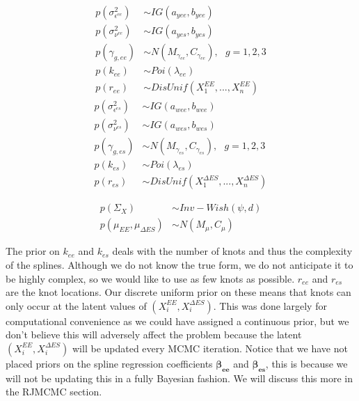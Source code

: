 \documentclass[11pt]{article}\usepackage[]{graphicx}\usepackage[]{color}
\begin{document}
\begin{multicols}{2}
\noindent 
  \begin{align}
  p(\sigma^2_{\epsilon^{ee}}) &\sim IG(a_{yee},b_{yee}) \\
  p(\sigma^2_{\nu^{ee}}) &\sim IG(a_{yes},b_{yes}) \\
  p(\gamma_{g,ee}) &\sim N(M_{\gamma_{ee}},C_{\gamma_{ee}})  , \text{ } g=1,2,3 \\
  p(k_{ee}) &\sim Poi(\lambda_{ee}) \\
  p(r_{ee}) &\sim DisUnif(X_1^{EE},...,X_n^{EE})
  \end{align}
\columnbreak
  \begin{align}
  p(\sigma^2_{\epsilon^{es}}) &\sim IG(a_{wee},b_{wee}) \\
  p(\sigma^2_{\nu^{es}}) &\sim IG(a_{wes},b_{wes}) \\
  p(\gamma_{g,es}) &\sim N(M_{\gamma_{es}},C_{\gamma_{es}}) , \text{ } g=1,2,3 \\
  p(k_{es}) &\sim Poi(\lambda_{es}) \\
  p(r_{es}) &\sim DisUnif(X_1^{\Delta ES},...,X_n^{\Delta ES})
  \end{align}
\end{multicols}



\begin{align}
   p(\Sigma_{X}) &\sim Inv-Wish(\psi,d) \\
   p(\mu_{EE},\mu_{\Delta ES}) &\sim N(M_{\mu},C_{\mu})
\end{align}



The prior on $k_{ee}$ and $k_{es}$ deals with the number of knots and thus the complexity of the splines. Although we do not know the true form, we do not anticipate it to be highly complex, so we would like to use as few knots as possible. $r_{ee}$ and $r_{es}$ are the knot locations. Our discrete uniform prior on these means that knots can only occur at the latent values of $(X_i^{EE},X_i^{\Delta ES})$. This was done largely for computational convenience as we could have assigned a continuous prior, but we don't believe this will adversely affect the problem because the latent $(X_i^{EE},X_i^{\Delta ES})$ will be updated every MCMC iteration. Notice that we have not placed priors on the spline regression coefficients $\boldsymbol{\beta_{ee}}$ and $\boldsymbol{\beta_{es}}$, this is because we will not be updating this in a fully Bayesian fashion. We will discuss this more in the RJMCMC section.
\end{document}
